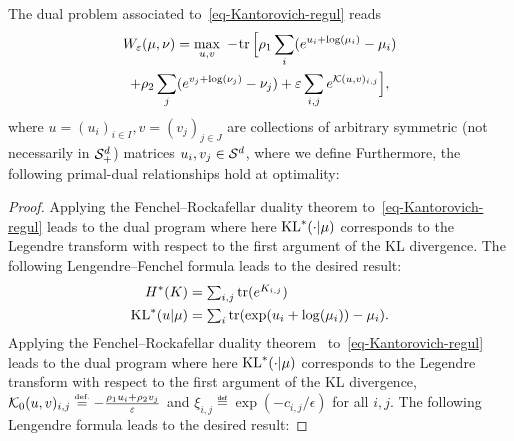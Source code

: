 \begin{prop}
	The dual problem associated to~\eqref{eq-Kantorovich-regul} reads
	\begin{multline}\label{eq-dual-pb}
		W_\varepsilon(\mu,\nu)
		= 
		\underset{u,v}{\max}\; -\!
				\operatorname{tr}\Big[
						\rho_1 \sum_i (e^{u_i+\log(\mu_i)} - \mu_i) \\
					+   \rho_2 \sum_j (e^{v_j+\log(\nu_j)} - \nu_j)
					+    \varepsilon \sum_{i,j}  e^{ \mathcal{K}(u,v)_{i,j} }
			 \Big], 
	\end{multline}	
	where $u=(u_i)_{i \in I}, v=(v_j)_{j \in J}$ are collections of arbitrary symmetric (not necessarily in $\mathcal{S}_+^d$) matrices $u_i, v_j \in \mathcal{S}^d$, 
	where we define
	Furthermore, the following primal-dual relationships hold at optimality:
\end{prop}
\begin{proof} 
Applying the Fenchel--Rockafellar duality theorem  to~\eqref{eq-Kantorovich-regul} leads to the dual program
where here $\operatorname{KL}^*(\cdot|\mu)$ corresponds to the Legendre transform with respect to the first argument of the KL divergence.
%
The following Lengendre--Fenchel  formula leads to the desired result:
\begin{align*} %
	H^*(K) &= \textstyle\sum_{i,j} \tr( e^{K_{i,j}} ) \\
	\KL^*(u|\mu) &= \textstyle\sum_i \tr( \exp(u_i+\log(\mu_i)) - \mu_i).
\end{align*}
%
\fi
Applying the Fenchel--Rockafellar duality theorem~\cite{rockafellar-convex} to~\eqref{eq-Kantorovich-regul} leads to the dual program
where here $\operatorname{KL}^*(\cdot|\mu)$ corresponds to the Legendre transform with respect to the first argument of the KL divergence, $ \Kern_0(u,v)_{i,j} \eqdef -\frac{\rho_1 u_i + \rho_2 v_j}{\epsilon}$ and $\xi_{i,j} \eqdef \exp(-c_{i,j}/\epsilon)$ for all $i,j$.
%
The following Lengendre formula leads to the desired result:
\end{proof}


